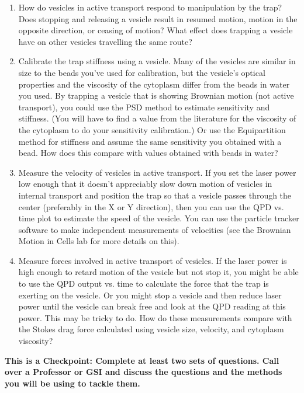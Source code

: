\documentclass{../lab}
\begin{document}
\begin{enumerate}
    \item How do vesicles in active transport respond to manipulation by the trap? Does stopping and releasing a vesicle result in resumed motion, motion in the opposite direction, or ceasing of motion? What effect does trapping a vesicle have on other vesicles travelling the same route?

    \item Calibrate the trap stiffness using a vesicle. Many of the vesicles are similar in size to the beads you've used for calibration, but the vesicle's optical properties and the viscosity of the cytoplasm differ from the beads in water you used. By trapping a vesicle that is showing Brownian motion (not active transport), you could use the PSD method to estimate sensitivity and stiffness. (You will have to find a value from the literature for the viscosity of the cytoplasm to do your sensitivity calibration.) Or use the Equipartition method for stiffness and assume the same sensitivity you obtained with a bead. How does this compare with values obtained with beads in water?

    \item Measure the velocity of vesicles in active transport. If you set the laser power low enough that it doesn't appreciably slow down motion of vesicles in internal transport and position the trap so that a vesicle passes through the center (preferably in the X or Y direction), then you can use the QPD vs. time plot to estimate the speed of the vesicle. You can use the particle tracker software to make independent measurements of velocities (see the Brownian Motion in Cells lab for more details on this).

    \item Measure forces involved in active transport of vesicles. If the laser power is high enough to retard motion of the vesicle but not stop it, you might be able to use the QPD output vs. time to calculate the force that the trap is exerting on the vesicle. Or you might stop a vesicle and then reduce laser power until the vesicle can break free and look at the QPD reading at this power. This may be tricky to do. How do these measurements compare with the Stokes drag force calculated using vesicle size, velocity, and cytoplasm viscosity?

\end{enumerate}


\textbf{This is a Checkpoint: Complete at least two sets of questions. Call over a Professor or GSI and discuss the questions and the methods you will be using to tackle them. }
\end{document}
